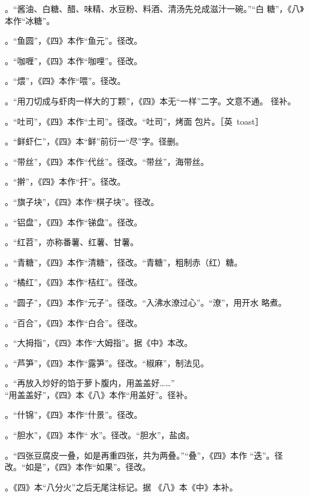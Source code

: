 \begin{list}{}
。“酱油、白糖、醋、味精、水豆粉、料酒、清汤先兑成滋汁一碗。”“白
糖”，《八》本作“冰糖”。

。“鱼圆”，《四》本作“鱼元”。径改。

。“咖喱”，《四》本作“咖哩”。径改。

。“煨”，《四》本作“喂”。径改。

。“用刀切成与虾肉一样大的丁颗”，《四》本无“一样”二字。文意不通。
径补。

。“吐司”，《四》本作“土司”。径改。“吐司”，烤面
包片。［英~toast］

。“鲜虾仁”，《四》本“鲜”前衍一“尽”字。径删。

。“带丝”，《四》本作“代丝”。径改。“带丝”，海带丝。

。“擀”，《四》本作“扞”。径改。

。“旗子块”，《四》本作“棋子块”。径改。

。“铝盘”，《四》本作“锑盘”。径改。

。“红苕”，亦称番薯、红薯、甘薯。

。“青糖”，《四》本作“清糖”，径改。“青糖”，粗制赤（红）糖。

。“橘红”，《四》本作“桔红”。径改。

。“圆子”，《四》本作“元子”。径改。“入沸水潦过心”。“潦”，用开水
略煮。

。“百合”，《四》本作“白合”。径改。

。“大拇指”，《四》本作“大姆指”。据《中》本改。

。“芦笋”，《四》本作“露笋”。径改。“椒麻”，制法见。

。“再放入炒好的馅于萝卜腹内，用盖盖好……”\\%
“用盖盖好”，《四》本《八》本作“用盖好”。径补。

。“什锦”，《四》本作“什景”。径改。

。“胆水”，《四》本作“𥑲水”。径改。“胆水”，盐卤。

。“四张豆腐皮一叠，如是再重四张，共为两叠。”“叠”，《四》本作
“迭”。径改。“如是”，《四》本作“如果”。径改。

。《四》本“八分火”之后无尾注标记{\footnotesize{}}。据
《八》本《中》本补。


\end{list}
